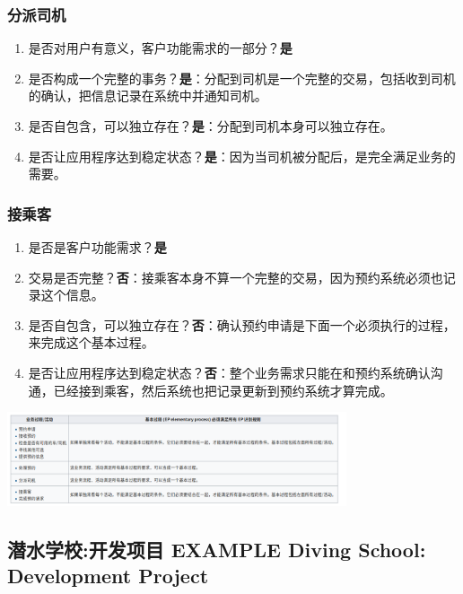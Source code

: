 \hypertarget{ux5206ux6d3eux53f8ux673a}{%
\subsubsection{分派司机}\label{ux5206ux6d3eux53f8ux673a}}

\begin{enumerate}
\tightlist
\item
  是否对用户有意义，客户功能需求的一部分？\textbf{是}
\item
  是否构成一个完整的事务？\textbf{是}：分配到司机是一个完整的交易，包括收到司机的确认，把信息记录在系统中并通知司机。
\item
  是否自包含，可以独立存在？\textbf{是}：分配到司机本身可以独立存在。
\item
  是否让应用程序达到稳定状态？\textbf{是}：因为当司机被分配后，是完全满足业务的需要。
\end{enumerate}

\hypertarget{ux63a5ux4e58ux5ba2}{%
\subsubsection{接乘客}\label{ux63a5ux4e58ux5ba2}}

\begin{enumerate}
\tightlist
\item
  是否是客户功能需求？\textbf{是}
\item
  交易是否完整？\textbf{否}：接乘客本身不算一个完整的交易，因为预约系统必须也记录这个信息。
\item
  是否自包含，可以独立存在？\textbf{否}：确认预约申请是下面一个必须执行的过程，来完成这个基本过程。
\item
  是否让应用程序达到稳定状态？\textbf{否}：整个业务需求只能在和预约系统确认沟通，已经接到乘客，然后系统也把记录更新到预约系统才算完成。
\end{enumerate}


\includegraphics[width=10cm]{Screenshotfrom2022122020-34-37.png}


\hypertarget{ux4e0eux56fdux9645ux529fux80fdux70b9ifpugux7684ux504fux5dee}{%
\subsection{潜水学校:开发项目 EXAMPLE Diving School: Development Project}\label{ux4e0eux56fdux9645ux529fux80fdux70b9ifpugux7684ux504fux5dee}}

